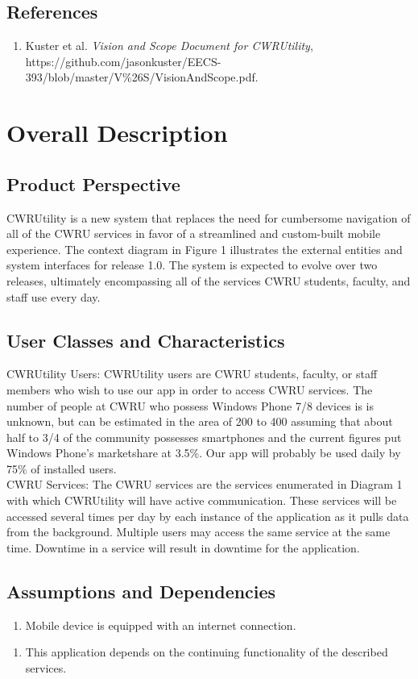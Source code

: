 \documentclass[pdftex,12pt,letter]{article}
\begin{document}
\subsection{References}
\begin{enumerate}[1.]
\item Kuster et al. \emph{Vision and Scope Document for CWRUtility}, https://github.com/jasonkuster/EECS-393/blob/master/V\%26S/VisionAndScope.pdf.
\end{enumerate}

\section{Overall Description}
\subsection{Product Perspective}
CWRUtility is a new system that replaces the need for cumbersome navigation of all of the CWRU services in favor of a streamlined and custom-built mobile experience. The context diagram in Figure 1 illustrates the external entities and system interfaces for release 1.0. The system is expected to evolve over two releases, ultimately encompassing all of the services CWRU students, faculty, and staff use every day.
\subsection{User Classes and Characteristics}
CWRUtility Users: CWRUtility users are CWRU students, faculty, or staff members who wish to use our app in order to access CWRU services. The number of people at CWRU who possess Windows Phone 7/8 devices is is unknown, but can be estimated in the area of 200 to 400 assuming that about half to 3/4 of the community possesses smartphones and the current figures put Windows Phone's marketshare at 3.5\%. Our app will probably be used daily by 75\% of installed users.\\
CWRU Services:  The CWRU services are the services enumerated in Diagram 1 with which CWRUtility will have active communication. These services will be accessed several times per day by each instance of the application as it pulls data from the background. Multiple users may access the same service at the same time. Downtime in a service will result in downtime for the application.
\subsection{Assumptions and Dependencies}
\begin{enumerate}[{A}S-1:]
\item Mobile device is equipped with an internet connection.
\end{enumerate}
\begin{enumerate}[DE-1:]
\item This application depends on the continuing functionality of the described services.
\end{enumerate}
\end{document}
